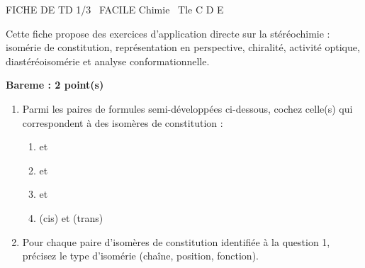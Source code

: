 \documentclass[11pt]{article}
\begin{document}
\begin{tcolorbox}[enhanced,colback=popink,colframe=popink,arc=10pt,boxrule=0pt,left=12pt,right=12pt,top=9pt,bottom=9pt]
{\color{white}\popxbold\small FICHE DE TD 1/3 \textbullet\ FACILE \hfill Chimie \textbullet\ Tle C D E\par}
\end{tcolorbox}
\vspace{4pt}
Cette fiche propose des exercices d'application directe sur la stéréochimie : isomérie de constitution, représentation en perspective, chiralité, activité optique, diastéréoisomérie et analyse conformationnelle.

\begin{exercice}
\newcommand{\bareme}[1]{\par\textbf{Bareme : #1 point(s)}\par}%
\bareme{2}
\begin{enumerate}
    \item Parmi les paires de formules semi-développées ci-dessous, cochez celle(s) qui correspondent à des isomères de constitution :
    \begin{enumerate}
        \item {} et 
        \item {} et 
        \item {} et 
        \item {} (cis) et  (trans)
    \end{enumerate}
    \item Pour chaque paire d'isomères de constitution identifiée à la question 1, précisez le type d'isomérie (chaîne, position, fonction).
\end{enumerate}
\end{exercice}
\end{document}
